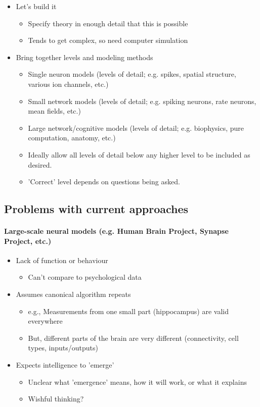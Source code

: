 \documentclass[10pt,letterpaper,oneside]{article}
\begin{document}
\begin{itemize}
	\item Let's build it
	\begin{itemize}
		\item Specify theory in enough detail that this is possible
		\item Tends to get complex, so need computer simulation
	\end{itemize}
	\item Bring together levels and modeling methods
	\begin{itemize}
		\item Single neuron models (levels of detail; e.g. spikes, spatial structure, various ion channels, etc.)
		\item Small network models (levels of detail; e.g. spiking neurons, rate neurons, mean fields, etc.)
		\item Large network/cognitive models (levels of detail; e.g. biophysics, pure computation, anatomy, etc.)
		\item Ideally allow all levels of detail below any higher level to be included as desired.
		\item 'Correct' level depends on questions being asked.
	\end{itemize}
\end{itemize}

\subsection{Problems with current approaches}

\paragraph{Large-scale neural models (e.g. Human Brain Project, Synapse Project, etc.)}

\begin{itemize}
	\item Lack of function or behaviour
	\begin{itemize}
		\item Can't compare to psychological data
	\end{itemize}
	\item Assumes canonical algorithm repeats
	\begin{itemize}
		\item e.g., Measurements from one small part (hippocampus) are valid everywhere
		\item But, different parts of the brain are very different (connectivity, cell types, inputs/outputs)
	\end{itemize}
	\item Expects intelligence to 'emerge'
	\begin{itemize}
		\item Unclear what 'emergence' means, how it will work, or what it explains
		\item Wishful thinking?
	\end{itemize}
\end{itemize}
\end{document}
